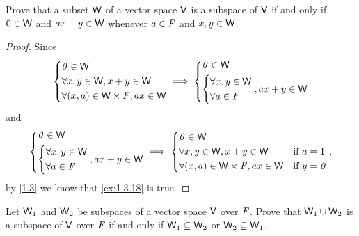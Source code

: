 \begin{ex}\label{ex:1.3.18}
  Prove that a subset \(\mathsf{W}\) of a vector space \(\mathsf{V}\) is a subspace of \(\mathsf{V}\) if and only if \(0 \in \mathsf{W}\) and \(ax + y \in \mathsf{W}\) whenever \(a \in \mathit{F}\) and \(x, y \in \mathsf{W}\).
\end{ex}

\begin{proof}
  Since
  \[
    \begin{dcases}
      \mathit{0} \in \mathsf{W}                        \\
      \forall x, y \in \mathsf{W}, x + y \in \mathsf{W} \\
      \forall (x, a) \in \mathsf{W} \times \mathit{F}, ax \in \mathsf{W}
    \end{dcases} \implies \begin{dcases}
      \mathit{0} \in \mathsf{W} \\
      \begin{dcases}
        \forall x, y \in \mathsf{W} \\
        \forall a \in \mathit{F}
      \end{dcases}, ax + y \in \mathsf{W}
    \end{dcases}
  \]
  and
  \[
    \begin{dcases}
      \mathit{0} \in \mathsf{W} \\
      \begin{dcases}
        \forall x, y \in \mathsf{W} \\
        \forall a \in \mathit{F}
      \end{dcases}, ax + y \in \mathsf{W}
    \end{dcases} \implies \begin{dcases}
      \mathit{0} \in \mathsf{W}                                                      \\
      \forall x, y \in \mathsf{W}, x + y \in \mathsf{W}          & \text{if } a = 1   \\
      \forall (x, a) \in \mathsf{W} \times \mathit{F}, ax \in \mathsf{W} & \text{if } y = \mathit{0}
    \end{dcases},
  \]
  by \cref{1.3} we know that \cref{ex:1.3.18} is true.
\end{proof}

\begin{ex}\label{ex:1.3.19}
  Let \(\mathsf{W}_{1}\) and \(\mathsf{W}_{2}\) be subspaces of a vector space \(\mathsf{V}\) over \(\mathit{F}\).
  Prove that \(\mathsf{W}_{1} \cup \mathsf{W}_{2}\) is a subspace of \(\mathsf{V}\) over \(\mathit{F}\) if and only if \(\mathsf{W}_{1} \subseteq \mathsf{W}_{2}\) or \(\mathsf{W}_{2} \subseteq \mathsf{W}_{1}\).
\end{ex}

